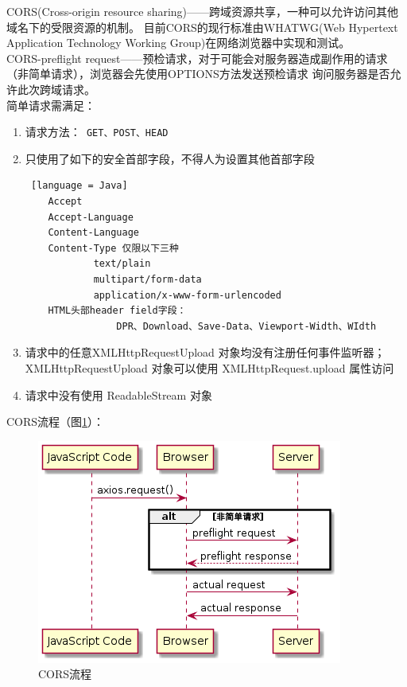 \begin{enumerate}
          CORS(Cross-origin resource sharing)——跨域资源共享，一种可以允许访问其他域名下的受限资源的机制。
          目前CORS的现行标准由WHATWG(Web Hypertext Application Technology Working Group)在网络浏览器中实现和测试。\\
          CORS-preflight request——预检请求，对于可能会对服务器造成副作用的请求（非简单请求），浏览器会先使用OPTIONS方法发送预检请求
          询问服务器是否允许此次跨域请求。\\
          简单请求需满足：
          \begin{enumerate}
              \item 请求方法：\lstinline[language = xml]| GET、POST、HEAD |
              \item 只使用了如下的安全首部字段，不得人为设置其他首部字段\begin{lstlisting} [language = Java]
    Accept
    Accept-Language
    Content-Language
    Content-Type 仅限以下三种
            text/plain
            multipart/form-data
            application/x-www-form-urlencoded
    HTML头部header field字段：
                DPR、Download、Save-Data、Viewport-Width、WIdth
              \end{lstlisting}
              \item 请求中的任意XMLHttpRequestUpload 对象均没有注册任何事件监听器；XMLHttpRequestUpload 对象可以使用 XMLHttpRequest.upload 属性访问
              \item 请求中没有使用 ReadableStream 对象
          \end{enumerate}
          CORS流程（图\ref{CORS-flow}）：
          \begin{figure}[h]
              \centering
              \includegraphics[scale = 0.6]{out/uml/时序图/CORS-flow/CORS-flow.png}
              \caption{\song\wuhao CORS流程}
              \label{CORS-flow}
          \end{figure}

\end{enumerate}
